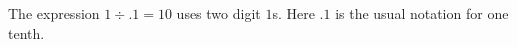 The expression $\boxed{1\div .1=10}$ uses two digit $1$s. Here $.1$ is the usual notation for one tenth.
